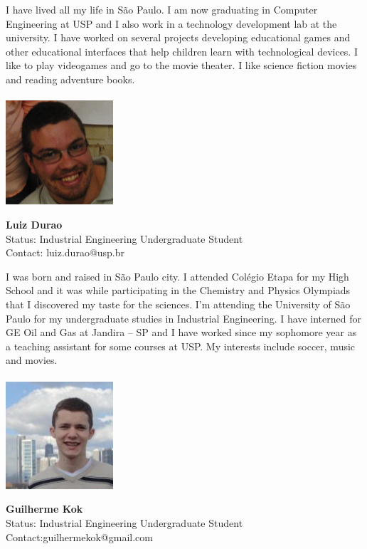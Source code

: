I have lived all my life in S\~{a}o Paulo. I am now graduating in Computer Engineering at USP and I also work in a technology development lab at the university. I have worked on several projects developing educational games and other educational interfaces that help children learn with technological devices.  I like to play videogames and go to the movie theater. I like science fiction movies and reading adventure books.
\\ \\

\noindent \includegraphics[width=40mm]{images/image015}
\parbox[b]{0.6\textwidth}{\textbf{Luiz Durao}\\
Status: Industrial Engineering Undergraduate Student \\
Contact: luiz.durao@usp.br  \\
}

I was born and raised in S\~{a}o Paulo city. I attended Colégio Etapa for my High School and it was while participating in the Chemistry and Physics Olympiads that I discovered my taste for the sciences. I'm attending the University of S\~{a}o Paulo for my undergraduate studies in Industrial Engineering. I have interned for GE Oil and Gas at Jandira – SP and I have worked since my sophomore year as a teaching assistant for some courses at USP. My interests include soccer, music and movies.
\\ \\

\noindent \includegraphics[width=40mm]{images/image016}
\parbox[b]{0.6\textwidth}{\textbf{Guilherme Kok}\\
Status: Industrial Engineering Undergraduate Student \\
Contact:guilhermekok@gmail.com  \\
}

